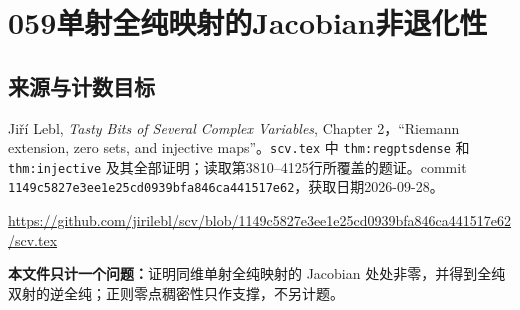 \documentclass[UTF8,11pt]{ctexart}
\theoremstyle{definition}
\begin{document}
\section*{059\quad 单射全纯映射的Jacobian非退化性}
\subsection*{来源与计数目标}
Ji\v{r}\'i Lebl, \emph{Tasty Bits of Several Complex Variables}, Chapter 2，``Riemann extension, zero sets, and injective maps''。\texttt{scv.tex} 中 \texttt{thm:regptsdense} 和 \texttt{thm:injective} 及其全部证明；读取第3810--4125行所覆盖的题证。commit \texttt{1149c5827e3ee1e25cd0939bfa846ca441517e62}，获取日期2026-09-28。
\par\url{https://github.com/jirilebl/scv/blob/1149c5827e3ee1e25cd0939bfa846ca441517e62/scv.tex}
\par\textbf{本文件只计一个问题：}证明同维单射全纯映射的 Jacobian 处处非零，并得到全纯双射的逆全纯；正则零点稠密性只作支撑，不另计题。
\end{document}
